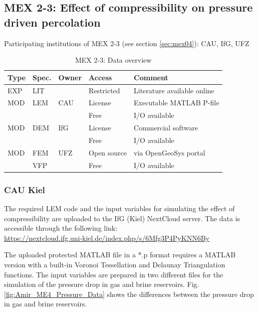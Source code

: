 \subsection{MEX 2-3: Effect of compressibility on pressure driven percolation}

Participating institutions of MEX 2-3 (see section \ref{sec:mex04}): CAU, IfG, UFZ

\begin{table}[ht!]
\caption{MEX 2-3: Data overview}
\label{tab:dms-mex23-overview}
\small
\begin{tabular}{l|l|l|l|L{4.7cm}}
\hline
{}
Type & Spec. & Owner & Access     & Comment                       \\ 
\hline 
EXP  & LIT   & \cite{Kamlot2009} & Restricted & Literature available online \\
\hline \hline
MOD  & LEM   & CAU   & License    & Executable MATLAB P-file      \\
     &       &       & Free       & I/O available                 \\
\hline
MOD  & DEM   & IfG   & License    & Commercial software           \\
     &       &       & Free       & I/O available                 \\
\hline
MOD  & FEM   & UFZ   & Open source & via OpenGeoSys portal        \\
     & VFP   &       & Free        & I/O available                \\
%
\hline
\end{tabular}
\end{table}
\normalsize

\subsubsection*{CAU Kiel}

The required LEM code and the input variables for simulating the effect of compressibility are uploaded to the IfG (Kiel) NextCloud server. The data is accessible through the following link:\\
\url{https://nextcloud.ifg.uni-kiel.de/index.php/s/6Mfg3P4PyKNN6By}

The uploaded protected MATLAB file in a *.p format requires a MATLAB version with a built-in Voronoi Tessellation and Delaunay Triangulation functions. The input variables are prepared in two different files for the simulation of the pressure drop in gas and brine reservoirs. Fig. \ref{fig:Amir_ME4_Pressure_Data} shows the differences between the pressure drop in gas and brine reservoirs.


